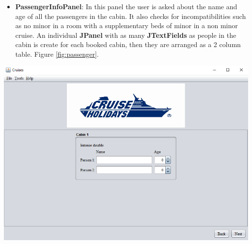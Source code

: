 \documentclass[11pt]{article}
\begin{document}
	\begin{qn}
		\begin{itemize}
	   	    \item \textbf{PassengerInfoPanel}: In this panel the user is asked about the name and age of all the passengers in the cabin. It also checks for incompatibilities such as no minor in a room with a supplementary beds of minor in a non minor cruise. An individual \textbf{JPanel} with as many \textbf{JTextFields} as people in the cabin is create for each booked cabin, then they are arranged as a 2 column table. Figure \ref{fig:passenger}.
	    \end{itemize}
	    \begin{center}
		    \begin{minipage}{0.8\linewidth}
		   	   	\includegraphics[width=\linewidth]{images/passenger.png}
		   	   	\label{fig:passenger}
		    \end{minipage}
	    \end{center}
    \end{qn}
    
\end{document}
